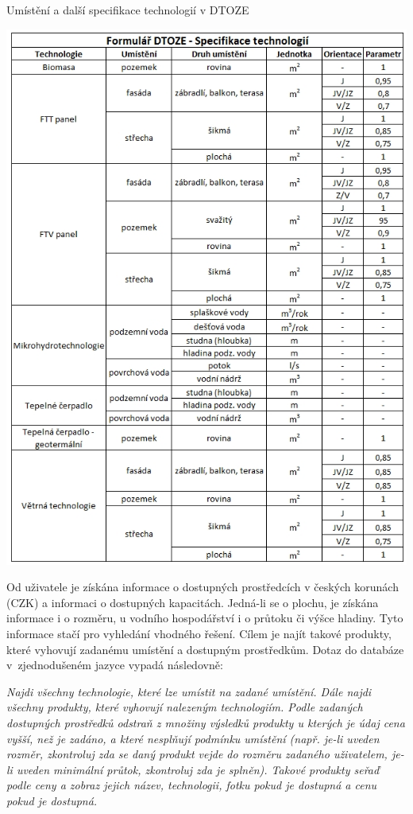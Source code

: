 \documentclass[11pt,a4paper]{article}
\begin{document}
\begin{table}[H] 
\centering 
\caption{Umístění a další specifikace technologií v DTOZE} 
\includegraphics[scale=0.54]{Formular_DTOZE_spectechnol} 
\label{fig:umisteni_technologii}
\end{table} 

Od uživatele je získána informace o dostupných prostředcích v českých korunách (CZK) a informaci o dostupných kapacitách. Jedná-li se o plochu, je získána informace i o rozměru, u vodního hospodářství i o průtoku či výšce hladiny. Tyto informace stačí pro vyhledání vhodného řešení. Cílem je najít takové produkty, které vyhovují zadanému umístění a dostupným prostředkům. Dotaz do databáze v~zjednodušeném jazyce vypadá následovně: 

\noindent \textit{Najdi všechny technologie, které lze umístit na zadané umístění. Dále najdi všechny produkty, které vyhovují nalezeným technologiím. Podle zadaných dostupných prostředků odstraň z množiny výsledků produkty u kterých je údaj cena vyšší, než je zadáno, a které nesplňují podmínku umístění (např. je-li uveden rozměr, zkontroluj zda se daný produkt vejde do rozměru zadaného uživatelem, je-li uveden minimální průtok, zkontroluj zda je splněn). Takové produkty seřaď podle ceny a zobraz jejich název, technologii, fotku pokud je dostupná a cenu pokud je dostupná.}
\end{document}
